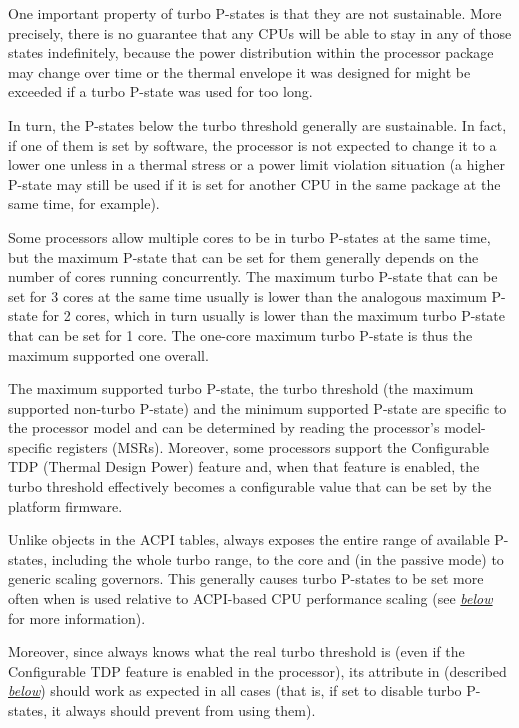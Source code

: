 \documentclass[a4paper,8pt,english]{sphinxmanual}
\begin{document}
One important property of turbo P-states is that they are not sustainable.  More
precisely, there is no guarantee that any CPUs will be able to stay in any of
those states indefinitely, because the power distribution within the processor
package may change over time  or the thermal envelope it was designed for might
be exceeded if a turbo P-state was used for too long.

In turn, the P-states below the turbo threshold generally are sustainable.  In
fact, if one of them is set by software, the processor is not expected to change
it to a lower one unless in a thermal stress or a power limit violation
situation (a higher P-state may still be used if it is set for another CPU in
the same package at the same time, for example).

Some processors allow multiple cores to be in turbo P-states at the same time,
but the maximum P-state that can be set for them generally depends on the number
of cores running concurrently.  The maximum turbo P-state that can be set for 3
cores at the same time usually is lower than the analogous maximum P-state for
2 cores, which in turn usually is lower than the maximum turbo P-state that can
be set for 1 core.  The one-core maximum turbo P-state is thus the maximum
supported one overall.

The maximum supported turbo P-state, the turbo threshold (the maximum supported
non-turbo P-state) and the minimum supported P-state are specific to the
processor model and can be determined by reading the processor's model-specific
registers (MSRs).  Moreover, some processors support the Configurable TDP
(Thermal Design Power) feature and, when that feature is enabled, the turbo
threshold effectively becomes a configurable value that can be set by the
platform firmware.

Unlike  objects in the ACPI tables,  always exposes
the entire range of available P-states, including the whole turbo range, to the
 core and (in the passive mode) to generic scaling governors.  This
generally causes turbo P-states to be set more often when  is
used relative to ACPI-based CPU performance scaling (see {\hyperref[admin\string-guide/pm/intel_pstate:acpi\string-cpufreq]{\emph{below}}}\label{admin-guide/pm/intel_pstate:acpi-cpufreq}
for more information).

Moreover, since  always knows what the real turbo threshold is
(even if the Configurable TDP feature is enabled in the processor), its
 attribute in  (described {\hyperref[admin\string-guide/pm/intel_pstate:no\string-turbo\string-attr]{\emph{below}}}\label{admin-guide/pm/intel_pstate:no-turbo-attr}) should
work as expected in all cases (that is, if set to disable turbo P-states, it
always should prevent  from using them).
\end{document}
